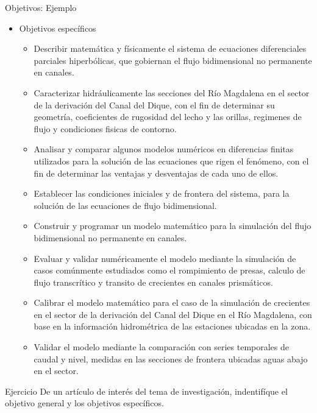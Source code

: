\documentclass[
10pt,
aspectratio=169,
]{beamer}
\begin{document}
\begin{frame}{Objetivos: Ejemplo}
\footnotesize
\begin{itemize}
\item \alert{Objetivos espec\'ificos}
\begin{itemize}
\footnotesize
\item Describir matem\'atica y f\'isicamente el sistema de ecuaciones diferenciales parciales hiperbólicas, que gobiernan el flujo bidimensional no permanente en canales.
\item Caracterizar hidr\'aulicamente las secciones del R\'io Magdalena en el sector de la derivaci\'on del Canal del Dique, con el fin de determinar su geometr\'ia, coeficientes de rugosidad del lecho y las orillas, regimenes de flujo y condiciones fisicas de contorno.
\item Analisar y comparar algunos modelos num\'ericos en diferencias finitas utilizados para la soluci\'on de las ecuaciones que rigen el fen\'omeno, con el fin de determinar las ventajas y desventajas de cada uno de ellos.
\item Establecer las condiciones iniciales y de frontera del sistema, para la soluci\'on de las ecuaciones de flujo bidimensional. 
\item Construir y programar un modelo matem\'atico para la simulaci\'on del flujo bidimensional no permanente en canales. 
\item Evaluar y validar num\'ericamente el modelo mediante la simulaci\'on de casos comúnmente estudiados como el rompimiento de presas, calculo de flujo transcr\'itico y transito de crecientes en canales prism\'aticos.
\item Calibrar el modelo matem\'atico para el caso de la simulaci\'on de crecientes en el sector de la derivaci\'on del Canal del Dique en el R\'io Magdalena, con base en la informaci\'on hidrom\'etrica de las estaciones ubicadas en la zona.
\item Validar el modelo mediante la comparaci\'on con series temporales de caudal y nivel, medidas en las secciones de frontera ubicadas aguas abajo en el sector. 
\end{itemize}
\end{itemize}

\end{frame}

\begin{frame}{Ejercicio}
De un art\'iculo de inter\'es del tema de investigaci\'on, indentif\'ique el objetivo general y los objetivos espec\'ificos.
\end{frame}
\end{document}
